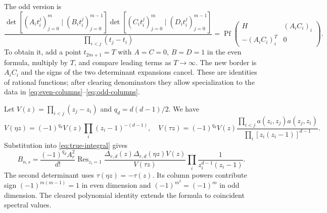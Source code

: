 \documentclass[11pt,a4paper]{amsart}
\theoremstyle{remark}\newtheorem{remark}[theorem]{Remark}
\numberwithin{equation}{section}
\DeclareMathOperator{\Pf}{Pf}
\DeclareMathOperator{\Res}{Res}
\begin{document}
The odd version is
\begin{equation}\label{eq:pf-border}
 \frac{\det[(A_it_i^j)_{j=0}^m\mid(B_it_i^j)_{j=0}^{m-1}]
 \det[(C_it_i^j)_{j=0}^m\mid(D_it_i^j)_{j=0}^{m-1}]}
 {\prod_{i<j}(t_j-t_i)}
 =\Pf\begin{pmatrix}H&(A_iC_i)_i\\-(A_iC_i)_i^T&0\end{pmatrix}.
\end{equation}
To obtain it, add a point $t_{2m+1}=T$ with $A=C=0$, $B=D=1$ in the even formula, multiply by $T$, and compare leading terms as $T\to\infty$. The new border is $A_iC_i$ and the signs of the two determinant expansions cancel. These are identities of rational functions; after clearing denominators they allow specialization to the data in \eqref{eq:even-columns}--\eqref{eq:odd-columns}.

Let $V(z)=\prod_{i<j}(z_j-z_i)$ and $q_d=d(d-1)/2$. We have
\[
 V(\eta z)=(-1)^{q_d}V(z)\prod_i(z_i-1)^{-(d-1)},\quad
 V(\tau z)=(-1)^{q_d}V(z)
 \frac{\prod_{i<j}a(z_i,z_j)a(z_j,z_i)}{\prod_i[z_i(z_i-1)]^{d-1}}.
\]
Substitution into \eqref{eq:true-integral} gives
\begin{equation}\label{eq:integral-pf-ready}
 B_{n,s}=\frac{(-1)^{q_d}A_r^2}{d!}\Res_{z_i=1}
 \frac{\Delta_{r,d}(z)\Delta_{r,d}(\eta z)V(z)}{V(\tau z)}
 \prod_i\frac1{z_i^{d-1}(z_i-1)}.
\end{equation}
The second determinant uses $\tau(\eta z)=-\tau(z)$. Its column powers contribute sign $(-1)^{m(m-1)}=1$ in even dimension and $(-1)^{m^2}=(-1)^m$ in odd dimension. The cleared polynomial identity extends the formula to coincident spectral values.
\end{document}
